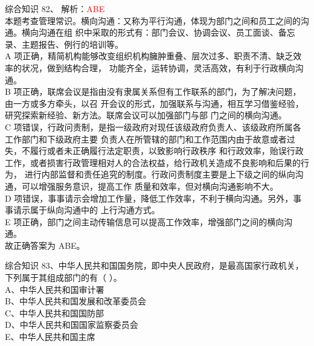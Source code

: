 \documentclass[aspectratio=169]{beamer}
\begin{document}
\begin{frame}[t]{综合知识}
    82、  解析：\textcolor{red}{ABE}\\
    {\scriptsize
    本题考查管理常识。横向沟通：又称为平行沟通，体现为部门之间和员工之间的沟通。横向沟通在组
    织中采取的形式有：部门会议、协调会议、员工面谈、备忘录、主题报告、例行的培训等。\\

    A 项正确，精简机构能够改变组织机构臃肿重叠、层次过多、职责不清、缺乏效率的状况，做到结构合理，
    功能齐全，运转协调，灵活高效，有利于行政横向沟通。\\

    B 项正确，联席会议是指由没有隶属关系但有工作联系的部门，为了解决问题，由一方或多方牵头，以召
    开会议的形式，加强联系与沟通，相互学习借鉴经验，研究探索新经验、新方法。联席会议可以加强部门与部
    门之间的横向沟通。\\
    C 项错误，行政问责制，是指一级政府对现任该级政府负责人、该级政府所属各工作部门和下级政府主要
    负责人在所管辖的部门和工作范围内由于故意或者过失，不履行或者未正确履行法定职责，以致影响行政秩序
    和行政效率，贻误行政工作，或者损害行政管理相对人的合法权益，给行政机关造成不良影响和后果的行为，
    进行内部监督和责任追究的制度。行政问责制度主要是上下级之间的纵向沟通，可以增强服务意识，提高工作
    质量和效率，但对横向沟通影响不大。\\
    D 项错误，事事请示会增加工作量，降低工作效率，不利于横向沟通。另外，事事请示属于纵向沟通中的
    上行沟通方式。\\
    E 项正确，部门之间主动传输信息可以提高工作效率，增强部门之间的横向沟通。\\
    故正确答案为 ABE。\\
    }
\end{frame}                           



\begin{frame}[t]{综合知识}
    83、中华人民共和国国务院，即中央人民政府，是最高国家行政机关，下列属于其组成部门的有（ ）。\\
    A、中华人民共和国审计署                                                                    \\
    B、中华人民共和国发展和改革委员会                                                          \\
    C、中华人民共和国国防部                                                                    \\
    D、中华人民共和国国家监察委员会                                                            \\
    E、中华人民共和国主席                                                                      \\
\end{frame}                           
\end{document}
